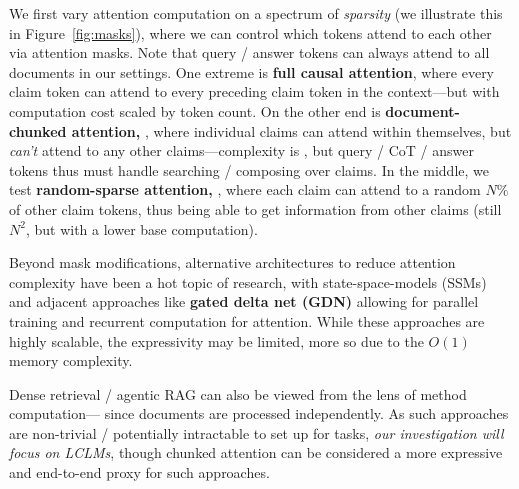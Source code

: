 






We first vary attention computation on a spectrum of \emph{sparsity} (we illustrate this in Figure~\ref{fig:masks}), where we can control which tokens attend to each other via attention masks. Note that query / answer tokens can always attend to all documents in our settings. One extreme is \textbf{full causal attention}, where every claim token can attend to every preceding claim token in the context---but with  computation cost scaled by token count. On the other end is \textbf{document-chunked attention, }, where individual claims can attend within themselves, but \emph{can't} attend to any other claims---complexity is , but query / CoT / answer tokens thus must handle searching / composing over claims. In the middle, we test \textbf{random-sparse attention, }, where each claim can attend to a random $N\%$ of other claim tokens, thus being able to get information from other claims (still $N^2$, but with a lower base computation).

Beyond mask modifications, alternative architectures to reduce attention complexity have been a hot topic of research, with state-space-models (SSMs) \citep{Katharopoulos2020TransformersAR, Gu2023MambaLS} and adjacent approaches like \textbf{gated delta net (GDN)} \citep{Yang2024GatedDN} allowing for parallel training and  recurrent computation for attention. While these approaches are highly scalable, the expressivity may be limited, more so due to the $O(1)$ memory complexity. 

Dense retrieval / agentic RAG can also be viewed from the lens of method computation--- since documents are processed independently. As such approaches are non-trivial / potentially intractable to set up for  tasks, \emph{our investigation will focus on LCLMs}, though chunked attention can be considered a more expressive and end-to-end proxy for such approaches.


